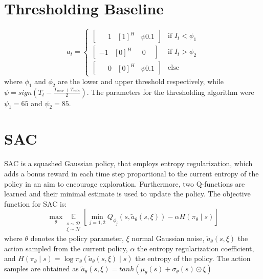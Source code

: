 \documentclass{article}
\theoremstyle{plain}
\theoremstyle{definition}
\theoremstyle{remark}
\begin{document}
\section{Thresholding Baseline} \label{sec:thresholding_baseline}
\begin{equation}
    a_t = \left\{
        \begin{array}{ll}
            \begin{bmatrix} \phantom{-}1 & [1]^H & \psi0.1 \end{bmatrix} & \text{if } I_t < \phi_1 \\
            \begin{bmatrix} -1 & [0]^H & \phantom{\psi}0\phantom{.1} \end{bmatrix} & \text{if } I_t > \phi_2 \\
            \begin{bmatrix} \phantom{-}0 & [0]^H & \psi0.1 \end{bmatrix} & \text{else}
        \end{array}
    \right.
\end{equation}
where $\phi_1$ and $\phi_2$ are the lower and upper threshold respectively, while $\psi = sign(T_t -\frac{T_{max} + T_{min}}{2})$.
The parameters for the thresholding algorithm were $\psi_1 = 65$ and $\psi_2 = 85$.

\section{SAC}\label{sec:sac}
SAC is a squashed Gaussian policy, that employs entropy regularization, which adds a bonus reward in each time step proportional to the current entropy of the policy in an aim to encourage exploration. Furthermore, two Q-functions are learned and their minimal estimate is used to update the policy. The objective function for SAC is:
\begin{equation}
    \max _\theta \underset{\substack{s \sim \mathcal{D} \\ \xi \sim \mathcal{N}}}{\mathbb{E}}\left[\min _{j=1,2} Q_{\phi_{\hat{j}}}\left(s, \tilde{a}_\theta(s, \xi)\right)-\alpha H(\pi_\theta \mid s)\right]
\end{equation}
where $\theta$ denotes the policy parameter, $\xi$ normal Gaussian noise, $\tilde{a}_\theta(s, \xi)$ the action sampled from the current policy, $\alpha$ the entropy regularization coefficient, and $H(\pi_\theta \mid s) = \log \pi_\theta\left(\tilde{a}_\theta(s, \xi) \mid s\right)$ the entropy of the policy. The action samples are obtained as $\tilde{a}_\theta(s, \xi) = tanh(\mu_\theta(s)+\sigma_\theta(s) \odot \xi)$
\end{document}
